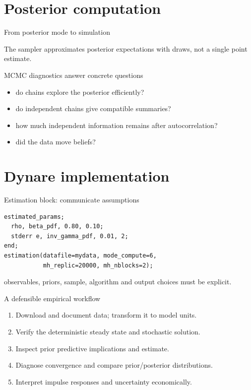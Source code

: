 \documentclass[aspectratio=169,10pt]{beamer}
\begin{document}
\section{Posterior computation}
\begin{frame}{From posterior mode to simulation}\centering{}
\vfill The sampler approximates posterior expectations with draws, not a single point estimate.\end{frame}
\begin{frame}{MCMC diagnostics answer concrete questions}\begin{itemize}\item {} do chains explore the posterior efficiently?\item {} do independent chains give compatible summaries?\item {} how much independent information remains after autocorrelation?\item {} did the data move beliefs?\end{itemize}\end{frame}
\section{Dynare implementation}
\begin{frame}[fragile]{Estimation block: communicate assumptions}\small\begin{verbatim}
estimated_params;
  rho, beta_pdf, 0.80, 0.10;
  stderr e, inv_gamma_pdf, 0.01, 2;
end;
estimation(datafile=mydata, mode_compute=6,
           mh_replic=20000, mh_nblocks=2);
\end{verbatim}
\vfill{} observables, priors, sample, algorithm and output choices must be explicit.
\end{frame}
\begin{frame}{A defensible empirical workflow}\begin{enumerate}\item Download and document data; transform it to model units.\item Verify the deterministic steady state and stochastic solution.\item Inspect prior predictive implications and estimate.\item Diagnose convergence and compare prior/posterior distributions.\item Interpret impulse responses and uncertainty economically.\end{enumerate}\end{frame}
\end{document}
